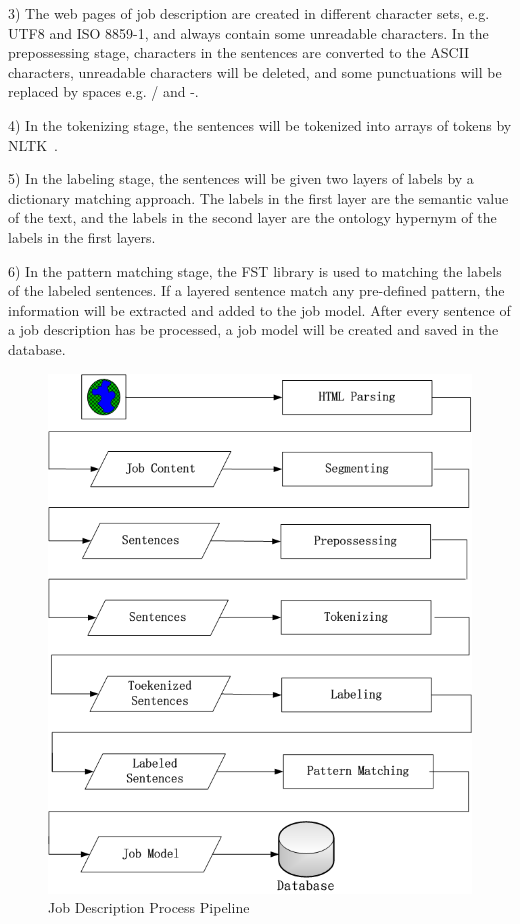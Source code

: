 3) The web pages of job description are created in different character sets, e.g. UTF8 and ISO 8859-1, and always contain some unreadable characters. In the prepossessing stage, characters in the sentences are converted to the ASCII characters, unreadable characters will be deleted, and some punctuations will be replaced by spaces e.g. / and -.

4) In the tokenizing stage, the sentences will be tokenized into arrays of tokens by NLTK~\cite{bird2006nltk}.

5) In the labeling stage, the sentences will be given two layers of labels by a dictionary matching approach. The labels in the first layer are the semantic value of the text, and the labels in the second layer are the ontology hypernym of the labels in the first layers.

6) In the pattern matching stage, the FST library is used to matching the labels of the labeled sentences.  If a layered sentence match any pre-defined pattern, the information will be extracted and added to the job model. After every sentence of a job description has be processed, a job model will be created and saved in the database.

\begin{figure}[htbp]
  \centering
  \includegraphics[scale=0.4]{images/pipeline2.png}
  \caption{Job Description Process Pipeline}
  \label{fig:Pipeline}
\end{figure}

